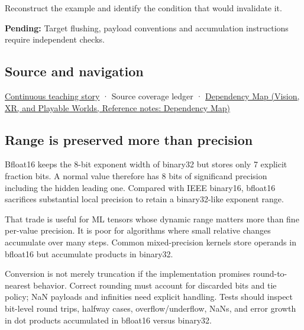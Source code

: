 Reconstruct the example and identify the condition that would invalidate it.

\textbf{Pending:} Target flushing, payload conventions and accumulation instructions require independent checks.

\subsection{Source and navigation}\label{appendix-18b8dd966b5d-source-and-navigation}

\hyperref[01-foundations-i-ch001-choosing-what-information-to-keep]{Continuous teaching story} · {Source coverage ledger} · \href{../07-Vision-XR-and-Playable-Worlds/main.pdf\#nameddest=appendix-4ad47bdd269a}{Dependency Map (Vision, XR, and Playable Worlds, Reference notes: Dependency Map)}

\subsection{Range is preserved more than precision}\label{appendix-18b8dd966b5d-range-is-preserved-more-than-precision}

Bfloat16 keeps the 8-bit exponent width of binary32 but stores only 7 explicit fraction bits. A normal value therefore has 8 bits of significand precision including the hidden leading one. Compared with IEEE binary16, bfloat16 sacrifices substantial local precision to retain a binary32-like exponent range.

That trade is useful for ML tensors whose dynamic range matters more than fine per-value precision. It is poor for algorithms where small relative changes accumulate over many steps. Common mixed-precision kernels store operands in bfloat16 but accumulate products in binary32.

Conversion is not merely truncation if the implementation promises round-to-nearest behavior. Correct rounding must account for discarded bits and tie policy; NaN payloads and infinities need explicit handling. Tests should inspect bit-level round trips, halfway cases, overflow/underflow, NaNs, and error growth in dot products accumulated in bfloat16 versus binary32.
